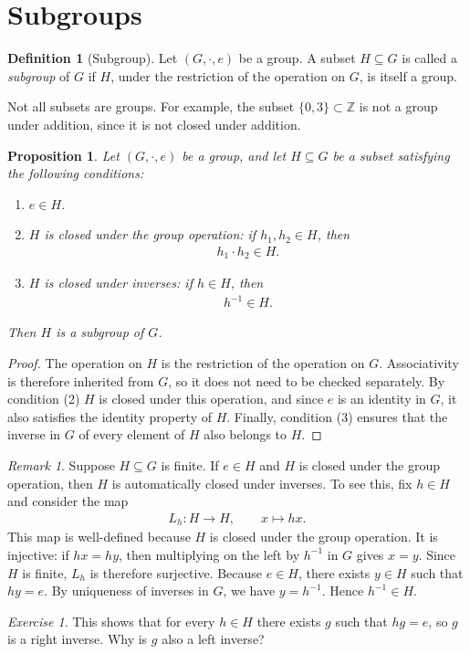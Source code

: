 \documentclass[reqno,11pt]{amsart}
\theoremstyle{definition}
\newtheorem{definition}{Definition}[section]
\theoremstyle{plain}
\newtheorem{proposition}{Proposition}[section]
\theoremstyle{remark}
\newtheorem*{remark}{Remark}
\newtheorem{exercise}[theorem]{Exercise}
\numberwithin{equation}{section}
\newcommand{\Z}{\mathbb{Z}}
\newcommand{\be}{\begin{eqnarray}}
\newcommand{\ee}{\end{eqnarray}}
\begin{document}
\section{Subgroups}

\begin{definition}[Subgroup]
Let $(G,\cdot,e)$ be a group. A subset $H\subseteq G$ is called a
\emph{subgroup} of $G$ if $H$, under the restriction of the operation on
$G$, is itself a group.
\end{definition}

Not all subsets are groups. For example, the subset $\{0,3\}\subset\Z$ is
not a group under addition, since it is not closed under addition.

\begin{proposition}
Let $(G,\cdot,e)$ be a group, and let $H\subseteq G$ be a subset satisfying
the following conditions:
\begin{enumerate}
  \item $e\in H$.
  \item $H$ is closed under the group operation: if $h_1,h_2\in H$, then
  \be
  h_1\cdot h_2\in H.
  \ee
  \item $H$ is closed under inverses: if $h\in H$, then
  \be
  h^{-1}\in H.
  \ee
\end{enumerate}
Then $H$ is a subgroup of $G$.
\end{proposition}

\begin{proof}
The operation on $H$ is the restriction of the operation on $G$.
Associativity is therefore inherited from $G$, so it does not need to be
checked separately. By condition (2) $H$ is closed under this operation, and
since $e$ is an identity in $G$, it also satisfies the identity property of
$H$. Finally, condition (3) ensures that the inverse in $G$ of every element
of $H$ also belongs to $H$.
\end{proof}

\begin{remark}
Suppose $H\subseteq G$ is finite. If $e\in H$ and $H$ is closed under the
group operation, then $H$ is automatically closed under inverses. To see
this, fix $h\in H$ and consider the map
\be
L_h\colon H\longrightarrow H,
  \qquad x\longmapsto hx.
\ee
This map is well-defined because $H$ is closed under the group operation. It
is injective: if $hx=hy$, then multiplying on the left by $h^{-1}$ in $G$
gives $x=y$. Since $H$ is finite, $L_h$ is therefore surjective. Because
$e\in H$, there exists $y\in H$ such that $hy=e$. By uniqueness of inverses
in $G$, we have $y=h^{-1}$. Hence $h^{-1}\in H$.

\begin{exercise}This shows that for every $h \in H$ there exists $g$ such that $hg=e$, so $g$ is a right inverse. Why is $g$ also a left inverse? \end{exercise}
\end{remark}
\end{document}
